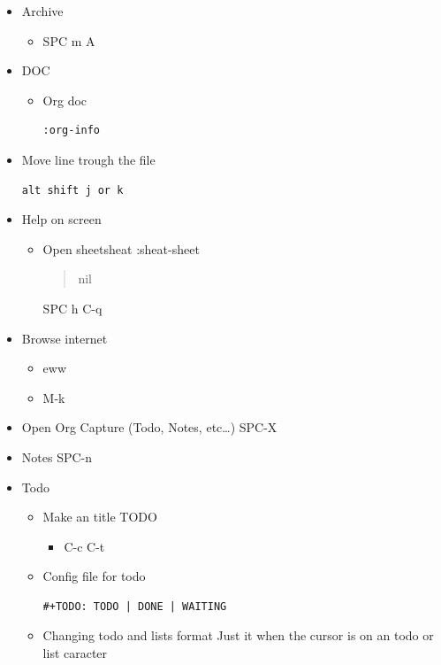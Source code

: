 \documentclass{article}
\begin{document}
\begin{itemize}
\item Archive
\label{sec:org315c092}
\begin{itemize}
\item SPC m A
\end{itemize}
\item DOC
\label{sec:orge2015c6}
\begin{itemize}
\item Org doc
\label{sec:orga881075}
\begin{verbatim}
:org-info
\end{verbatim}
\end{itemize}
\item Move line trough the file
\label{sec:orgb87d464}
\begin{verbatim}
alt shift j or k
\end{verbatim}
\item Help on screen
\label{sec:org1172aea}
\begin{itemize}
\item Open sheetsheat
\label{sec:org0a40305}
:sheat-sheet
\begin{quote}
nil\end{quote}
SPC h C-q
\end{itemize}
\item Browse internet
\label{sec:org75f5270}
\begin{itemize}
\item eww
\item M-k
\end{itemize}
\item Open Org Capture (Todo, Notes, etc\ldots{})
\label{sec:org2467e32}
SPC-X
\item Notes
\label{sec:org6dd6862}
SPC-n
\item Todo
\label{sec:org31fcdfa}
\begin{itemize}
\item Make an title TODO
\label{sec:orgd1fa00e}
\begin{itemize}
\item C-c C-t
\end{itemize}
\item Config file for todo
\label{sec:orga1ddb20}
\begin{verbatim}
#+TODO: TODO | DONE | WAITING
\end{verbatim}
\item Changing todo and lists format
\label{sec:orgde1e891}
Just it when the cursor is on an todo or list caracter
\begin{itemize}

\end{itemize}
\end{itemize}
\end{itemize}
\end{document}

